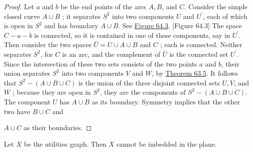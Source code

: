 \begin{proof}
Let \(a\) and \(b\) be the end points of the arcs \(A,B\), and \(C\). Consider the simple closed curve \(A \cup B\) ; it separates \(S^{2}\) into two components \(U\) and \(U^{\prime }\), each of which is open in \(S^{2}\) and has boundary \(A \cup B\). See \hyperref[fig:64.3]{Figure 64.3}.
[Figure 64.3]
The space \(C - a - b\) is connected, so it is contained in one of these components, say in \(U^{\prime }\). Then consider the two spaces \(\bar{U} = U \cup A \cup B\) and \(C\) ; each is connected. Neither separates \(S^{2}\), for \(C\) is an arc, and the complement of \(\bar{U}\) is the connected set \(U^{\prime }\). Since the intersection of these two sets consists of the two points \(a\) and \(b\), their union separates \(S^{2}\) into two components \(V\) and \(W\), by \hyperref[thm:63.5]{Theorem 63.5}. It follows that \(S^{2} - ( {A \cup B \cup C})\) is the union of the three disjoint connected sets \(U,V\), and \(W\) ; because they are open in \(S^{2}\), they are the components of \(S^{2} - ( {A \cup B \cup C})\). The component \(U\) has \(A \cup B\) as its boundary. Symmetry implies that the other two have \(B \cup C\) and

\(A \cup C\) as their boundaries.
\end{proof}
\begin{theorem}
\label{thm:\thetheorem}
Let \(X\) be the utilities graph. Then \(X\) cannot be imbedded in the plane.
\end{theorem}

